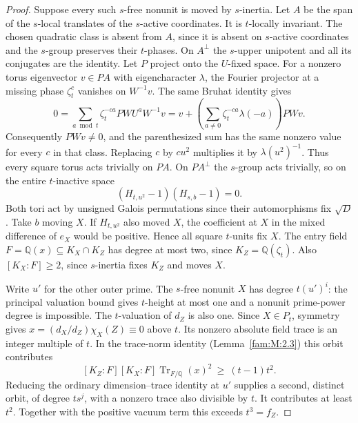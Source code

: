 \documentclass[11pt,a4paper]{article}
\numberwithin{equation}{section}
\theoremstyle{remark}
\newcommand{\QQ}{\mathbb Q}
\begin{document}
\begin{proof}
Suppose every such $s$-free nonunit is moved by $s$-inertia.
Let $A$ be the span of the $s$-local translates of the
$s$-active coordinates. It is $t$-locally invariant. The chosen
quadratic class is absent from $A$, since it is absent on
$s$-active coordinates and the $s$-group preserves their
$t$-phases. On $A^\perp$ the $s$-upper unipotent and all its
conjugates are the identity. Let $P$ project onto the $U$-fixed
space. For a nonzero torus eigenvector $v\in PA$ with
eigencharacter $\lambda$, the Fourier projector at a missing
phase $\zeta_t^c$ vanishes on $W^{-1}v$. The same Bruhat identity
gives
\[
 0=\sum_{a\bmod t}\zeta_t^{-ca}P WU^aW^{-1}v
   =v+\left(\sum_{a\ne0}\zeta_t^{-ca}\lambda(-a)\right)PWv .
\]
Consequently $PWv\ne0$, and the parenthesized sum has the same
nonzero value for every $c$ in that class. Replacing $c$ by
$cu^2$ multiplies it by $\lambda(u^2)^{-1}$. Thus every square
torus acts trivially on $PA$. On $P A^\perp$ the $s$-group acts
trivially, so on the entire $t$-inactive space
\[
                (H_{t,u^2}-1)(H_{s,b}-1)=0 .
\]
Both tori act by unsigned Galois permutations since their
automorphisms fix $\sqrt D$. Take $b$ moving $X$. If $H_{t,u^2}$
also moved $X$, the coefficient at $X$ in the mixed difference
of $e_X$ would be positive. Hence all square $t$-units fix $X$.
The entry field $F=\QQ(x)\subseteq K_X\cap K_Z$ has degree at
most two, since $K_Z=\QQ(\zeta_t)$. Also $[K_X:F]\ge2$, since
$s$-inertia fixes $K_Z$ and moves $X$.

Write $u'$ for the other outer prime. The $s$-free nonunit $X$
has degree $t(u')^i$: the principal valuation bound gives
$t$-height at most one and a nonunit prime-power degree is
impossible. The $t$-valuation of $d_Z$ is also one.
Since $X\in P_t$, symmetry gives
$x=(d_X/d_Z)\chi_X(Z)\equiv0$ above $t$. Its nonzero absolute
field trace is an integer multiple of $t$. In the trace-norm
identity (Lemma~\ref{fam:M:2.3}) this orbit contributes
\[
 [K_Z:F][K_X:F]\operatorname{Tr}_{F/\QQ}(x)^2
                         \ \ge\ (t-1)t^2 .
\]
Reducing the ordinary dimension--trace identity at $u'$ supplies
a second, distinct orbit, of degree $t s^j$, with a nonzero trace
also divisible by $t$. It contributes at least $t^2$.
Together with the positive vacuum term this exceeds $t^3=f_Z$.
\end{proof}
\end{document}
